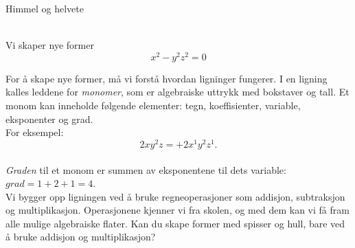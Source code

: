 \documentclass[no]{./../../common/SurferDesc}%
\begin{document}
\footnotesize


\begin{surferPage}
  \begin{surferTitle}Himmel og helvete\end{surferTitle}  \\
Vi skaper nye former \\
\smallskip
\[x^2	- y^2z^2	= 0\]

\singlespacing
For å skape nye former, må vi forstå hvordan ligninger fungerer. I en ligning kalles leddene for {\it monomer}, som er algebraiske uttrykk med bokstaver og tall.
\singlespacing
Et monom kan inneholde følgende elementer: 
tegn, koeffisienter, variable, eksponenter og grad.\\
\singlespacing
For eksempel: 
\smallskip
\[2xy^2z = +2x^1y^2z^1.\]
\\
\smallskip
{\it Graden} til et monom er summen av eksponentene til dets variable: $grad  = 1 + 2 + 1 = 4$.  \\
\singlespacing
Vi bygger opp ligningen ved å bruke regneoperasjoner som addisjon, subtraksjon og multiplikasjon. Operasjonene kjenner vi fra skolen, og med dem kan vi få fram alle mulige algebraiske flater.
\singlespacing
Kan du skape former med spisser og hull, bare ved å bruke addisjon og multiplikasjon?


  \begin{surferText}
     \end{surferText}
\end{surferPage}
\end{document}
